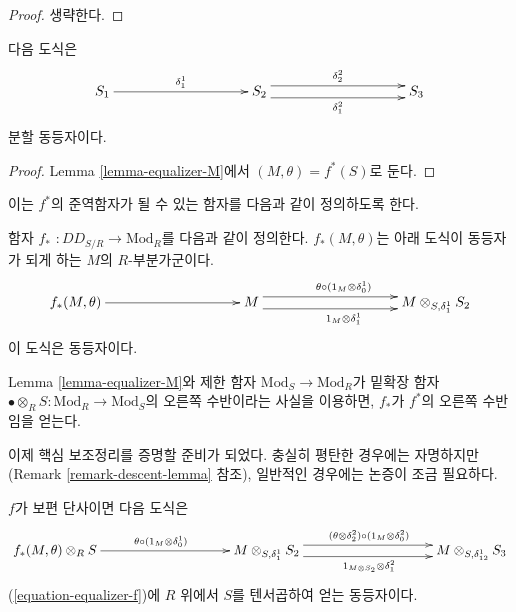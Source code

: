 \begin{proof}
생략한다.
\end{proof}

\begin{lemma}
\label{lemma-equalizer-S}
다음 도식은
\begin{equation}
\label{equation-equalizer-S}
\xymatrix@C=8pc{
S_1 \ar[r]^{\delta^1_1} &
S_2 \ar@<1ex>[r]^{\delta^2_2} \ar@<-1ex>[r]_{\delta^2_1} & 
S_3
}
\end{equation}
분할 동등자이다.
\end{lemma}

\begin{proof}
Lemma \ref{lemma-equalizer-M}에서 $(M, \theta) = f^*(S)$로 둔다.
\end{proof}

\noindent
이는 $f^*$의 준역함자가 될 수 있는 함자를 다음과 같이 정의하도록 한다.

\begin{definition}
\label{definition-pushforward}
함자 {\it $f_*$} $: DD_{S/R} \to \text{Mod}_R$를 다음과 같이 정의한다.
$f_*(M, \theta)$는 아래 도식이 동등자가 되게 하는 $M$의 $R$-부분가군이다.
\begin{equation}
\label{equation-equalizer-f}
\xymatrix@C=8pc{f_*(M,\theta) \ar[r] & M \ar@<1ex>^{\theta \circ (1_M \otimes 
\delta_0^1)}[r] \ar@<-1ex>_{1_M \otimes \delta_1^1}[r] & 
M \otimes_{S, \delta_1^1} S_2 
}
\end{equation}
이 도식은 동등자이다.
\end{definition}

\noindent
Lemma \ref{lemma-equalizer-M}와 제한 함자
$\text{Mod}_S \to \text{Mod}_R$가 밑확장 함자
$\bullet \otimes_R S: \text{Mod}_R \to \text{Mod}_S$의 오른쪽 수반이라는
사실을 이용하면, $f_*$가 $f^*$의 오른쪽 수반임을 얻는다.

\medskip\noindent
이제 핵심 보조정리를 증명할 준비가 되었다. 충실히 평탄한 경우에는
자명하지만(Remark \ref{remark-descent-lemma} 참조), 일반적인 경우에는
논증이 조금 필요하다.

\begin{lemma}
\label{lemma-descent-lemma}
$f$가 보편 단사이면 다음 도식은
\begin{equation}
\label{equation-equalizer-f2}
\xymatrix@C=8pc{
f_*(M, \theta) \otimes_R S
\ar[r]^{\theta \circ (1_M \otimes \delta_0^1)} &
M \otimes_{S, \delta_1^1} S_2 
\ar@<1ex>[r]^{(\theta \otimes \delta_2^2) \circ (1_M \otimes \delta^2_0)}
\ar@<-1ex>[r]_{1_{M \otimes S_2} \otimes \delta^2_1} &
M \otimes_{S, \delta_{12}^1} S_3
}
\end{equation}
(\ref{equation-equalizer-f})에 $R$ 위에서 $S$를 텐서곱하여 얻는
동등자이다.
\end{lemma}

